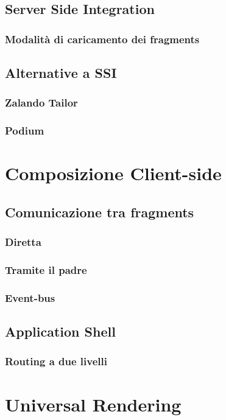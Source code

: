 \subsection*{Server Side Integration}

\subsubsection*{Modalità di caricamento dei fragments}

\subsection*{Alternative a SSI}
\subsubsection*{Zalando Tailor}
\subsubsection*{Podium}

\pagebreak
\section*{Composizione Client-side}

\subsection*{Comunicazione tra fragments}

\subsubsection*{Diretta}
\subsubsection*{Tramite il padre}
\subsubsection*{Event-bus}


\subsection*{Application Shell}


\subsubsection*{Routing a due livelli}




\pagebreak
\section*{Universal Rendering}